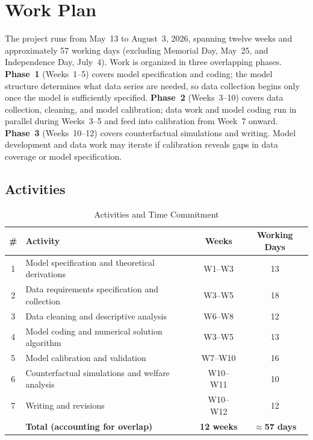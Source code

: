 \section{Work Plan}

The project runs from May~13 to August~3, 2026, spanning twelve weeks
and approximately 57 working days (excluding Memorial Day, May~25, and
Independence Day, July~4). Work is organized in three overlapping phases.
\textbf{Phase~1} (Weeks~1--5) covers model specification and coding;
the model structure determines what data series are needed, so data
collection begins only once the model is sufficiently specified.
\textbf{Phase~2} (Weeks~3--10) covers data collection, cleaning, and
model calibration; data work and model coding run in parallel during
Weeks~3--5 and feed into calibration from Week~7 onward.
\textbf{Phase~3} (Weeks~10--12) covers counterfactual simulations and
writing. Model development and data work may iterate if calibration
reveals gaps in data coverage or model specification.

\subsection*{Activities}

\begin{table}[htbp]
\centering
\caption{Activities and Time Commitment}
\begin{tabular}{clcc}
\toprule
\textbf{\#} & \textbf{Activity} & \textbf{Weeks} & \textbf{Working Days} \\
\midrule
1 & Model specification and theoretical derivations  & W1--W3   & 13 \\
2 & Data requirements specification and collection   & W3--W5   & 18 \\
3 & Data cleaning and descriptive analysis           & W6--W8   & 12 \\
4 & Model coding and numerical solution algorithm    & W3--W5   & 13 \\
5 & Model calibration and validation                 & W7--W10  & 16 \\
6 & Counterfactual simulations and welfare analysis  & W10--W11 & 10 \\
7 & Writing and revisions                            & W10--W12 & 12 \\
\midrule
  & \textbf{Total (accounting for overlap)} & \textbf{12 weeks} & \textbf{$\approx$57 days} \\
\bottomrule
\end{tabular}
\end{table}

